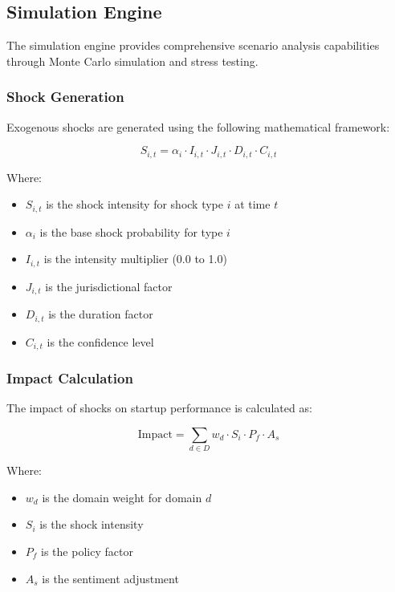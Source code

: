 \subsection{Simulation Engine}

The simulation engine provides comprehensive scenario analysis capabilities through Monte Carlo simulation and stress testing.

\subsubsection{Shock Generation}
Exogenous shocks are generated using the following mathematical framework:

\begin{equation}
S_{i,t} = \alpha_i \cdot I_{i,t} \cdot J_{i,t} \cdot D_{i,t} \cdot C_{i,t}
\end{equation}

Where:
\begin{itemize}
    \item $S_{i,t}$ is the shock intensity for shock type $i$ at time $t$
    \item $\alpha_i$ is the base shock probability for type $i$
    \item $I_{i,t}$ is the intensity multiplier (0.0 to 1.0)
    \item $J_{i,t}$ is the jurisdictional factor
    \item $D_{i,t}$ is the duration factor
    \item $C_{i,t}$ is the confidence level
\end{itemize}

\subsubsection{Impact Calculation}
The impact of shocks on startup performance is calculated as:

\begin{equation}
\text{Impact} = \sum_{d \in D} w_d \cdot S_i \cdot P_f \cdot A_s
\end{equation}

Where:
\begin{itemize}
    \item $w_d$ is the domain weight for domain $d$
    \item $S_i$ is the shock intensity
    \item $P_f$ is the policy factor
    \item $A_s$ is the sentiment adjustment
\end{itemize}

